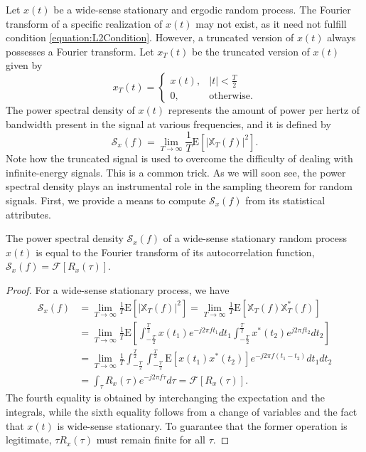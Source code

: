 Let $x(t)$ be a wide-sense stationary and ergodic random process.
The Fourier transform of a specific realization of $x(t)$ may not exist, as it need not fulfill condition \eqref{equation:L2Condition}.
However, a truncated version of $x(t)$ always possesses a Fourier transform.
Let $x_T(t)$ be the truncated version of $x(t)$ given by
\begin{equation*}
x_T(t) = \begin{cases} x(t), & |t| < \frac{T}{2} \\
0, & \text{otherwise} . \end{cases}
\end{equation*}
The power spectral density of $x(t)$ represents the amount of power per hertz of bandwidth present in the signal at various frequencies, and it is defined by
\begin{equation*}
\mathcal{S}_x(f) = \lim_{T \rightarrow \infty} \frac{1}{T} \mathrm{E} \left[ |\mathbb{X}_T(f)|^2 \right] .
\end{equation*}
Note how the truncated signal is used to overcome the difficulty of dealing with infinite-energy signals.
This is a common trick.
As we will soon see, the power spectral density plays an instrumental role in the sampling theorem for random signals.
First, we provide a means to compute $\mathcal{S}_x(f)$ from its statistical attributes.

\begin{theorem}
The power spectral density $\mathcal{S}_x (f)$ of a wide-sense stationary random process $x(t)$ is equal to the Fourier transform of its autocorrelation function, $\mathcal{S}_x (f) = \mathcal{F} [R_x (\tau)]$.
\end{theorem}
\begin{proof}
For a wide-sense stationary process, we have
\begin{equation*}
\begin{split}
\mathcal{S}_x(f) &= \lim_{T \rightarrow \infty} \frac{1}{T} \mathrm{E} \left[ |\mathbb{X}_T(f)|^2 \right]
= \lim_{T \rightarrow \infty} \frac{1}{T} \mathrm{E} \left[ \mathbb{X}_T(f) \mathbb{X}_T^*(f) \right] \\
&= \lim_{T \rightarrow \infty} \frac{1}{T} \mathrm{E} \left[
\int_{-\frac{T}{2}}^{\frac{T}{2}} x(t_1) e^{-j2 \pi f t_1} dt_1
\int_{-\frac{T}{2}}^{\frac{T}{2}} x^*(t_2) e^{j2 \pi f t_2} dt_2 \right] \\
&= \lim_{T \rightarrow \infty} \frac{1}{T}
\int_{-\frac{T}{2}}^{\frac{T}{2}} \int_{-\frac{T}{2}}^{\frac{T}{2}}
\mathrm{E} \left[ x(t_1) x^*(t_2) \right]
e^{-j2 \pi f (t_1-t_2)} dt_1 dt_2 \\
&= \int_{\tau} R_x (\tau) e^{-j2 \pi f\tau} d\tau
= \mathcal{F} [ R_x (\tau) ] .
\end{split}
\end{equation*}
The fourth equality is obtained by interchanging the expectation and the integrals, while the sixth equality follows from a change of variables and the fact that $x(t)$ is wide-sense stationary.
To guarantee that the former operation is legitimate, $\tau R_x(\tau)$ must remain finite for all $\tau$.
\end{proof}


